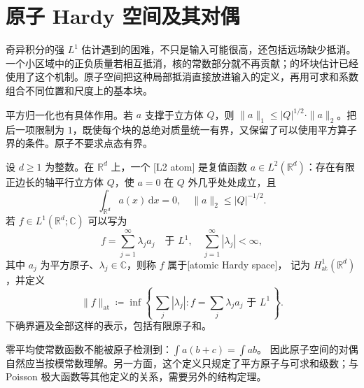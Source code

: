 \section{原子 Hardy 空间及其对偶}
\label{b2:sec:app-C-3}

奇异积分的强 \(L^1\) 估计遇到的困难，不只是输入可能很高，还包括远场缺少抵消。一个小区域中的正负质量若相互抵消，核的常数部分就不再贡献；的坏块估计已经使用了这个机制。原子空间把这种局部抵消直接放进输入的定义，再用可求和系数组合不同位置和尺度上的基本块。

\ProseParagraphBreak

平方归一化也有具体作用。若 \(a\) 支撑于立方体 \(Q\)，则
\(\|a\|_1\le |Q|^{1/2}\cdot\|a\|_2\)。把后一项限制为 \(1\)，既使每个块的总绝对质量统一有界，又保留了可以使用平方算子界的条件。原子不要求点态有界。

\begin{definition}\label{b2:def:C-atom}
设 \(d\ge1\) 为整数。在 \(\mathbb R^d\) 上，一个
[L2 atom]
是复值函数 \(a\in L^2(\mathbb R^d)\)：存在有限正边长的轴平行立方体
\(Q\)，使 \(a=0\) 在 \(Q\) 外几乎处处成立，且
\[
 \int_{\mathbb R^d}a(x)\,\mathrm dx=0,
 \quad
 \|a\|_2\le |Q|^{-1/2}.
\]
若 \(f\in L^1(\mathbb R^d;\mathbb C)\) 可以写为
\[
 f=\sum_{j=1}^\infty\lambda_ja_j
 \quad\text{于 }L^1,\quad
 \sum_{j=1}^\infty|\lambda_j|<\infty,
\]
其中 \(a_j\) 为平方原子、\(\lambda_j\in\mathbb C\)，则称
\(f\) 属于[atomic Hardy space]，
记为 \(H^1_{\mathrm{at}}(\mathbb R^d)\)，并定义
\[
 \|f\|_{\mathrm{at}}
 \coloneqq\inf\left\{\,
       \sum_j|\lambda_j|:
       f=\sum_j\lambda_ja_j\text{ 于 }L^1
       \,\right\}.
\]
下确界遍及全部这样的表示，包括有限原子和。
\end{definition}

零平均使常数函数不能被原子检测到：\(\int a(b+c)=\int ab\)。
因此原子空间的对偶自然应当按模常数理解。另一方面，这个定义只规定了平方原子与可求和级数；与 Poisson 极大函数等其他定义的关系，需要另外的结构定理。

